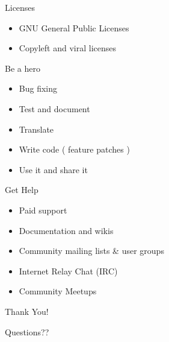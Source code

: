 \documentclass{beamer}
\begin{document}
\begin{frame}{Licenses}
\begin{itemize}
 \item GNU General Public Licenses
 \pause
 \item Copyleft and viral licenses 
\end{itemize}
\end{frame}

\begin{frame}{Be a hero}
\begin{itemize}
 \item Bug fixing
 \pause
 \item Test and document
 \pause
 \item Translate
 \pause
 \item Write code ( feature patches ) 
 \pause
 \item Use it and share it
 \end{itemize}
\end{frame}

\begin{frame}{Get Help}
\begin{itemize}
 \item Paid support
 \pause
 \item Documentation and wikis
 \pause
 \item Community mailing lists \& user groups
 \pause
 \item Internet Relay Chat (IRC)
 \pause
 \item Community Meetups
\end{itemize}
\end{frame}

\begin{frame}{Thank You!}
\begin{center}
Questions??
\end{center}
\end{frame}
\end{document}
